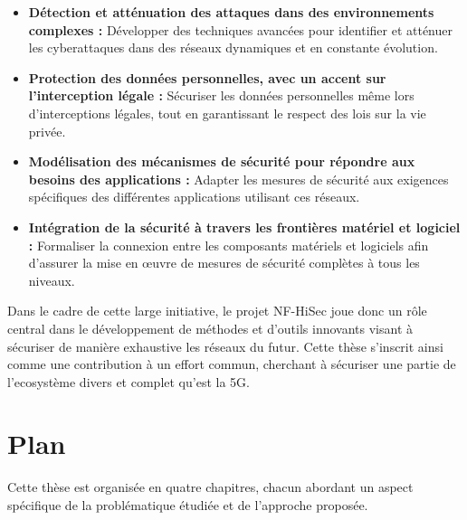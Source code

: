 \documentclass[a4paper,11pt,twoside]{StyleThese}
\begin{document}
\begin{itemize}
\item \textbf{Détection et atténuation des attaques dans des environnements complexes :} Développer des techniques avancées pour identifier et atténuer les cyberattaques dans des réseaux dynamiques et en constante évolution.
\item \textbf{Protection des données personnelles, avec un accent sur l'interception légale :} Sécuriser les données personnelles même lors d'interceptions légales, tout en garantissant le respect des lois sur la vie privée.
\item \textbf{Modélisation des mécanismes de sécurité pour répondre aux besoins des applications :} Adapter les mesures de sécurité aux exigences spécifiques des différentes applications utilisant ces réseaux.
\item \textbf{Intégration de la sécurité à travers les frontières matériel et logiciel :} Formaliser la connexion entre les composants matériels et logiciels afin d'assurer la mise en œuvre de mesures de sécurité complètes à tous les niveaux.
\end{itemize}

Dans le cadre de cette large initiative, le projet NF-HiSec joue donc un rôle central dans le développement de méthodes et d'outils innovants visant à sécuriser de manière exhaustive les réseaux du futur. Cette thèse s'inscrit ainsi comme une contribution à un effort commun, cherchant à sécuriser une partie de l'ecosystème divers et complet qu'est la 5G.

\newpage

\section*{Plan}
Cette thèse est organisée en quatre chapitres, chacun abordant un aspect spécifique de la problématique étudiée et de l'approche proposée.
\end{document}
